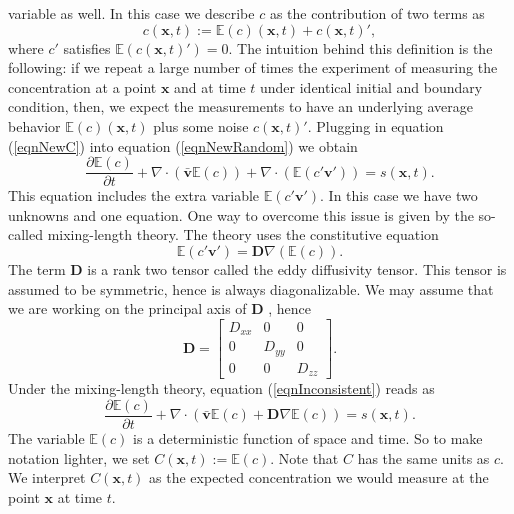 \documentclass[12pt]{book}
\newcommand{\E}{\mathbb{E}} %
\newcommand{\x}{\textbf{x}}
\newcommand{\vv}{\textbf{v}}
\newcommand{\dv}{\nabla\cdot}
\begin{document}
variable as well. In this case we describe $c$ as the contribution of two terms as 
\begin{equation}\label{eqnNewC}
c(\x,t):=\E(c)(\x,t)+c(\x,t)',
\end{equation}
where $c'$ satisfies $\E(c(\x,t)')=0$. The intuition behind this definition is the following: if we repeat a large number of times the experiment
of measuring the concentration at a point $\x$ and at time $t$ under identical initial and boundary condition,  then, we expect the 
measurements to have an underlying average behavior $\E(c)(\x,t)$ plus some  noise $c(\x,t)'$.
Plugging in  equation (\ref{eqnNewC}) into equation (\ref{eqnNewRandom}) we obtain
\begin{equation}\label{eqnInconsistent}
\frac{\partial\E(c)}{\partial t}+\dv(\bar{\vv}\E(c))+\dv(\E(c'\vv'))=s(\x,t).
\end{equation}
This equation includes  the extra variable $\E(c'\vv')$.
In this case we have two unknowns and one equation. 
One way to overcome this issue is given by the so-called mixing-length theory. The
theory uses the constitutive equation
\begin{equation*}
\E(c'\vv')=\textbf{D}\nabla(\E(c)).
\end{equation*}
The term $\textbf{D}$ is  a rank two tensor called the eddy diffusivity tensor. This tensor is assumed 
to be symmetric, hence is always diagonalizable. We may assume that we are working
on the principal axis of $\textbf{D}$ \cite{seinfeld1998atmospheric}, hence 
\begin{equation*}
\textbf{D}=\begin{bmatrix}
D_{xx}& 0 & 0\\
0 & D_{yy} & 0\\
0 & 0 & D_{zz}
\end{bmatrix}.
\end{equation*}
Under the mixing-length theory, equation (\ref{eqnInconsistent}) reads as
\begin{equation}\label{eqnfirstDifferentialForm}
\frac{\partial\E(c)}{\partial t}+\dv(\bar{\vv}\E(c)+\textbf{D}\nabla\E(c))=s(\x,t).
\end{equation}
The variable $\E(c)$ is a deterministic function of space and time. So to make
notation lighter,  we set $C(\x,t):=\E(c)$. Note that $C$ has the same units
as $c$. We interpret $C(\x,t)$ as the expected concentration we would measure
at the point $\x$ at time $t$.
\end{document}
